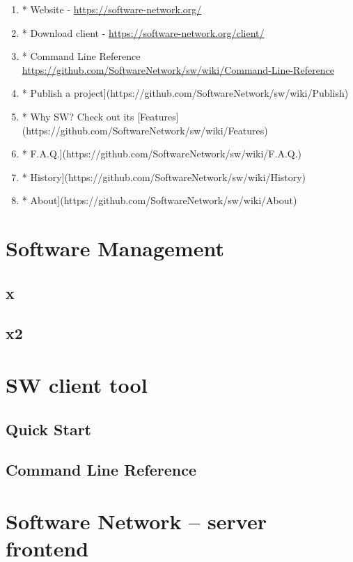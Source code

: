 \begin{enumerate}

\item
* Website - \url{https://software-network.org/}

\item
* Download client - \url{https://software-network.org/client/}

\item
* Command Line Reference \url{https://github.com/SoftwareNetwork/sw/wiki/Command-Line-Reference}

\item
* Publish a project](https://github.com/SoftwareNetwork/sw/wiki/Publish)

\item
* Why SW? Check out its [Features](https://github.com/SoftwareNetwork/sw/wiki/Features)

\item
* F.A.Q.](https://github.com/SoftwareNetwork/sw/wiki/F.A.Q.)

\item
* History](https://github.com/SoftwareNetwork/sw/wiki/History)

\item
* About](https://github.com/SoftwareNetwork/sw/wiki/About)

\end{enumerate}



\chapter{Software Management}

\section{x}

\section{x2}

\chapter{SW client tool}

\section{Quick Start}

\section{Command Line Reference}



\chapter{Software Network -- server frontend}
